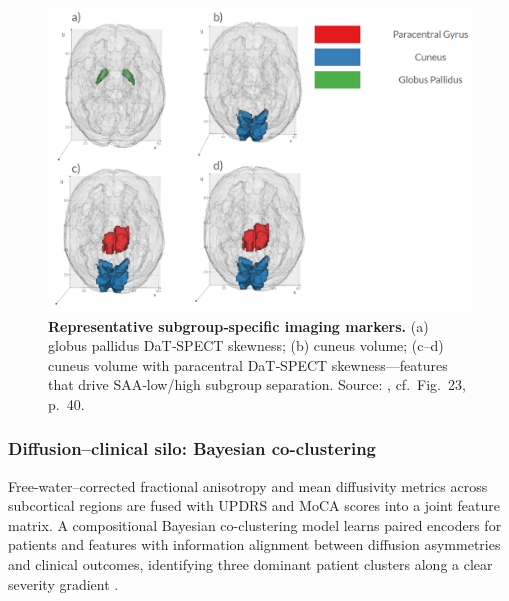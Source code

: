 \documentclass[11pt]{article}
\begin{document}
\begin{figure}[h!]
    \centering
    \includegraphics[width=\linewidth]{figures/CoclusterImages.png}
    \caption{\textbf{Representative subgroup‑specific imaging markers.} (a) globus pallidus DaT‑SPECT skewness; (b) cuneus volume; (c–d) cuneus volume with paracentral DaT‑SPECT skewness---features that drive SAA‑low/high subgroup separation. Source: \cite{dominick2025brain}, cf.\ Fig.~23, p.~40.}
    \label{fig:imaging-cocluster}
\end{figure}

\subsubsection{Diffusion--clinical silo: Bayesian co-clustering}
Free-water–corrected fractional anisotropy and mean diffusivity metrics across subcortical regions are fused with UPDRS and MoCA scores into a joint feature matrix. A compositional Bayesian co-clustering model learns paired encoders for patients and features with information alignment between diffusion asymmetries and clinical outcomes, identifying three dominant patient clusters along a clear severity gradient \cite{vinod2025compositional}.
\end{document}
